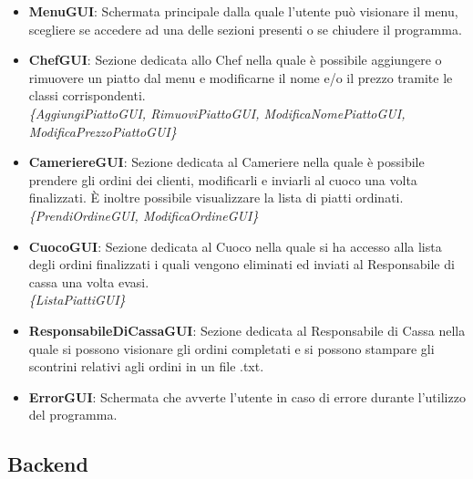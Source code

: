 \documentclass{article}
\begin{document}
    \begin{itemize}
        \item \textbf{MenuGUI}: Schermata principale dalla quale l'utente può visionare il menu, scegliere se accedere ad una delle sezioni presenti o se chiudere il programma.
    
        \item \textbf{ChefGUI}: Sezione dedicata allo Chef nella quale è possibile aggiungere o rimuovere un piatto dal menu e  modificarne il nome e/o il prezzo tramite le classi corrispondenti.
        \\\textit{\{AggiungiPiattoGUI, RimuoviPiattoGUI, ModificaNomePiattoGUI, ModificaPrezzoPiattoGUI\}}
    
        \item \textbf{CameriereGUI}: Sezione dedicata al Cameriere nella quale è possibile prendere gli ordini dei clienti, modificarli e inviarli al cuoco una volta finalizzati. È inoltre possibile visualizzare la lista di piatti ordinati.
        \\\textit{\{PrendiOrdineGUI, ModificaOrdineGUI\}}
    
        \item \textbf{CuocoGUI}: Sezione dedicata al Cuoco nella quale si ha accesso alla lista degli ordini finalizzati i quali vengono eliminati ed inviati al Responsabile di cassa una volta evasi.
        \\\textit{\{ListaPiattiGUI\}}
    
        \item \textbf{ResponsabileDiCassaGUI}: Sezione dedicata al Responsabile di Cassa nella quale si possono visionare gli ordini completati e si possono stampare gli scontrini relativi agli ordini in un file .txt.
    
        \item \textbf{ErrorGUI}: Schermata che avverte l'utente in caso di errore durante l'utilizzo del programma.
    \end{itemize} 
        
    \subsection{Backend}
    
\end{document}
